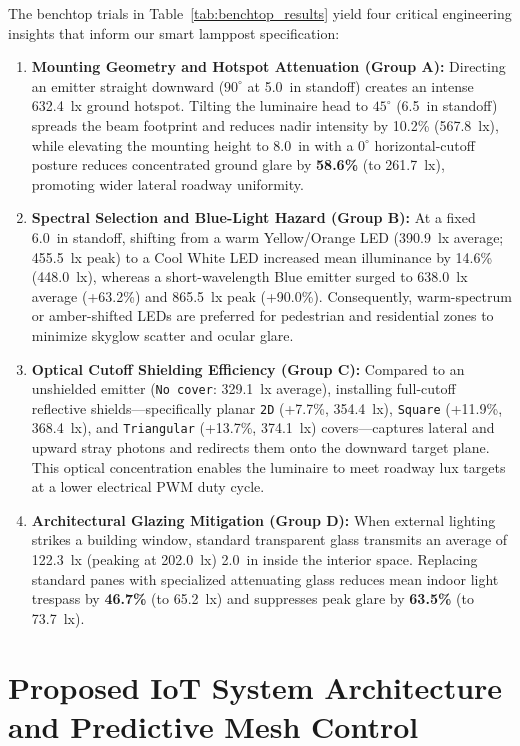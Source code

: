 \documentclass[11pt,a4paper]{article}
\begin{document}
The benchtop trials in Table~\ref{tab:benchtop_results} yield four critical engineering insights that inform our smart lamppost specification:
\begin{enumerate}
    \item \textbf{Mounting Geometry and Hotspot Attenuation (Group A):} Directing an emitter straight downward (\(90^\circ\) at 5.0~in standoff) creates an intense 632.4~lx ground hotspot. Tilting the luminaire head to \(45^\circ\) (6.5~in standoff) spreads the beam footprint and reduces nadir intensity by 10.2\% (567.8~lx), while elevating the mounting height to 8.0~in with a \(0^\circ\) horizontal-cutoff posture reduces concentrated ground glare by \textbf{58.6\%} (to 261.7~lx), promoting wider lateral roadway uniformity.
    \item \textbf{Spectral Selection and Blue-Light Hazard (Group B):} At a fixed 6.0~in standoff, shifting from a warm Yellow/Orange LED (390.9~lx average; 455.5~lx peak) to a Cool White LED increased mean illuminance by 14.6\% (448.0~lx), whereas a short-wavelength Blue emitter surged to 638.0~lx average (+63.2\%) and 865.5~lx peak (+90.0\%). Consequently, warm-spectrum or amber-shifted LEDs are preferred for pedestrian and residential zones to minimize skyglow scatter and ocular glare.
    \item \textbf{Optical Cutoff Shielding Efficiency (Group C):} Compared to an unshielded emitter (\texttt{No cover}: 329.1~lx average), installing full-cutoff reflective shields---specifically planar \texttt{2D} (+7.7\%, 354.4~lx), \texttt{Square} (+11.9\%, 368.4~lx), and \texttt{Triangular} (+13.7\%, 374.1~lx) covers---captures lateral and upward stray photons and redirects them onto the downward target plane. This optical concentration enables the luminaire to meet roadway lux targets at a lower electrical PWM duty cycle.
    \item \textbf{Architectural Glazing Mitigation (Group D):} When external lighting strikes a building window, standard transparent glass transmits an average of 122.3~lx (peaking at 202.0~lx) 2.0~in inside the interior space. Replacing standard panes with specialized attenuating glass reduces mean indoor light trespass by \textbf{46.7\%} (to 65.2~lx) and suppresses peak glare by \textbf{63.5\%} (to 73.7~lx).
\end{enumerate}

\section{Proposed IoT System Architecture and Predictive Mesh Control}
\end{document}
